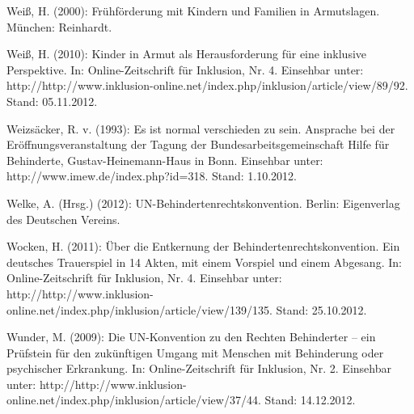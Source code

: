 Weiß, H. (2000): Frühförderung mit Kindern und Familien in Armutslagen. München: Reinhardt.

Weiß, H. (2010): Kinder in Armut als Herausforderung für eine inklusive Perspektive. In: Online-Zeitschrift für Inklusion, Nr. 4. Einsehbar unter: http://http://www.inklusion-online.net/index.php/inklusion/article/view/89/92. Stand: 05.11.2012.

Weizsäcker, R. v. (1993): Es ist normal verschieden zu sein. Ansprache bei der Eröffnungsveranstaltung der Tagung der Bundesarbeitsgemeinschaft Hilfe für Behinderte, Gustav-Heinemann-Haus in Bonn. Einsehbar unter: http://www.imew.de/index.php?id=318. Stand: 1.10.2012.

Welke, A. (Hrsg.) (2012): UN-Behindertenrechtskonvention. Berlin: Eigenverlag des Deutschen Vereins. 


Wocken, H. (2011): Über die Entkernung der Behindertenrechtskonvention.
Ein deutsches Trauerspiel in 14 Akten, mit einem Vorspiel und einem Abgesang. In: Online-Zeitschrift für Inklusion, Nr. 4. Einsehbar unter: http://http://www.inklusion-online.net/index.php/inklusion/article/view/139/135. Stand: 25.10.2012. 

Wunder, M. (2009): Die UN-Konvention zu den Rechten Behinderter – ein Prüfstein für den zukünftigen Umgang mit Menschen mit Behinderung oder psychischer Erkrankung. In: Online-Zeitschrift für Inklusion, Nr. 2. Einsehbar unter: http://http://www.inklusion-online.net/index.php/inklusion/article/view/37/44. Stand: 14.12.2012.  
